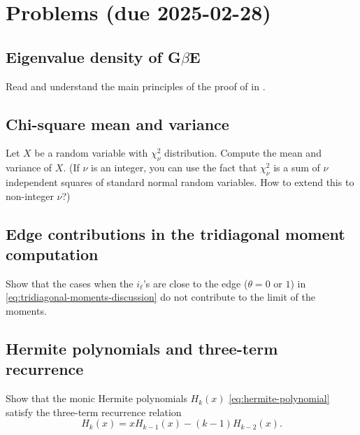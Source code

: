 \documentclass[letterpaper,11pt,oneside,reqno]{article}
\numberwithin{equation}{section}
\theoremstyle{definition}
\begin{document}
\appendix
\setcounter{section}{3}

\section{Problems (due 2025-02-28)}

\subsection{Eigenvalue density of G$\beta$E}

Read and understand the main principles of the
proof of 
in \cite{dumitriu2002matrix}.

\subsection{Chi-square mean and variance}

Let $X$ be a random variable with $\chi^2_\nu$ distribution. Compute the mean and variance of $X$.
(If $\nu$ is an integer, you can use the fact that $\chi^2_\nu$ is a sum of $\nu$ independent squares of standard normal random variables.
How to extend this to non-integer \(\nu\)?)

\subsection{Edge contributions in the tridiagonal moment computation}
\label{prob:edges-in-tridiagonal}

Show that the cases when the $i_{\ell}$'s are close to the edge ($\theta=0$ or $1$)
in \eqref{eq:tridiagonal-moments-discussion}
do not contribute to the limit of the moments.

\subsection{Hermite polynomials and three-term recurrence}
\label{prob:Hermite-3-term}

Show that the monic Hermite polynomials $H_k(x)$
\eqref{eq:hermite-polynomial}
satisfy the three-term recurrence relation
\begin{equation*}
	\label{eq:hermite-3-term}
	H_k(x) = x H_{k-1}(x) - (k-1) H_{k-2}(x).
\end{equation*}

\subsection{}
\label{prob:Vandermonde-determinant}
\end{document}

